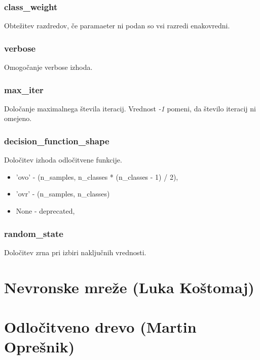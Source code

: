 \documentclass[a4paper,11pt]{article}
\begin{document}
\subsubsection{class_weight}
	Obtežitev razdredov, če paramaeter ni podan so vsi razredi enakovredni.

\subsubsection{verbose}
	Omogočanje verbose izhoda.

\subsubsection{max_iter}
	Določanje maximalnega števila iteracij. Vrednost \textit{-1} pomeni, da število iteracij ni omejeno.

\subsubsection{decision_function_shape}
	Določitev izhoda odločitvene funkcije.
	\begin{itemize}
		\item{'ovo'  - (n_samples, n_classes * (n_classes - 1) / 2),}
		\item{'ovr'  - (n_samples, n_classes) }
		\item{None  - deprecated,}
	\end{itemize}

\subsubsection{random_state}
	Določitev zrna pri izbiri naključnih vrednosti.



\section{Nevronske mreže (Luka Koštomaj)}


 
\section{Odločitveno drevo (Martin Oprešnik) }
\end{document}
